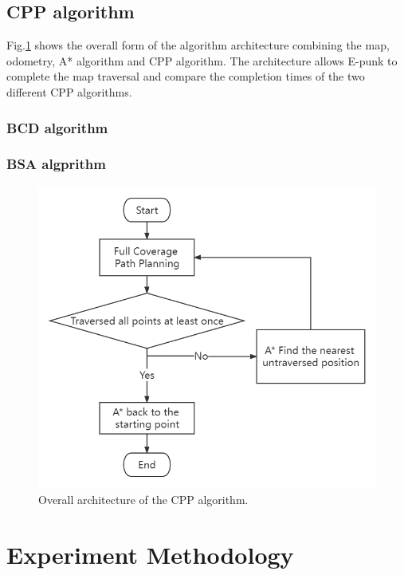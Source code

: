 \documentclass[conference]{IEEEtran}
\begin{document}
\subsection{CPP algorithm}
 Fig.\ref{fig4} shows the overall form of the algorithm architecture combining the map, odometry, A* algorithm and CPP algorithm. The architecture allows E-punk to complete the map traversal and compare the completion times of the two different CPP algorithms.
\subsubsection{BCD algorithm}
\subsubsection{BSA algprithm}

\begin{figure}[htbp]
\centerline{\includegraphics[scale=0.35]{RS_Report/RS_Report (1).png}}
\caption{Overall architecture of the CPP algorithm.}
\label{fig4}
\end{figure}


\section{Experiment Methodology}
\end{document}
